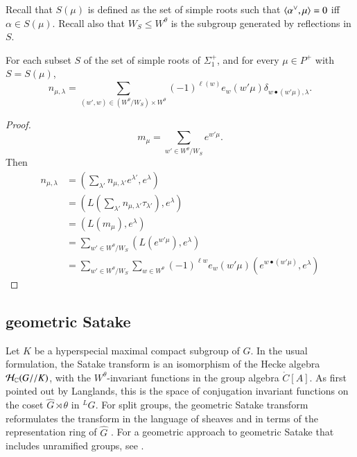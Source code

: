 Recall that $S(\mu)$ is defined as the set of simple roots
such that 
$\langle{\alpha^\vee,\mu}\rangle=0$ iff $\alpha\in S(\mu)$.
%
Recall also that $W_S\le W^\theta$ is the subgroup generated by reflections in $S$.

\begin{lemma}  For each subset $S$ of the set of simple roots of $\Sigma^+_1$,
and for every $\mu\in P^+$ with $S = S(\mu)$,
\[
n_{\mu,\lambda}=\sum_{(w',w)\in (W^\theta/W_S)\times W^\theta} (-1)^{\ell(w)} e_w(w'\mu) \delta_{w\bullet (w'\mu),\lambda}. 
\]
\end{lemma}

\begin{proof}  
\[
m_\mu = \sum_{w'\in W^\theta/W_S} e^{w' \mu}.
\]
Then
\begin{align*}
n_{\mu,\lambda} 
    &= (\sum_{\lambda'} n_{\mu,{\lambda'}} e^{\lambda'},e^\lambda) \\
     &= (L(\sum_{\lambda'} n_{\mu,\lambda'} \tau_{\lambda'}),e^\lambda) \\
     &= (L(m_\mu),e^\lambda) \\
     &= \sum_{w'\in W^\theta/W_S} (L(e^{w'\mu}),e^\lambda)\\
     &= \sum_{w'\in W^\theta/W_S} \sum_{w\in W^\theta} (-1)^{\ell w} e_w(w'\mu) (e^{w\bullet (w'\mu)},e^\lambda)
\end{align*}
\end{proof}

\subsection{geometric Satake}

Let $K$ be a hyperspecial maximal compact subgroup of $G$.  In the usual
formulation,  the Satake transform is an isomorphism of the 
Hecke algebra $\mathcal H_{\mathbb{C}}(G//K)$, with the $W^\theta$-invariant functions in the
group algebra $\ring{C}[A]$.  As first pointed out by Langlands, this is the
space of conjugation invariant functions on the coset $\hat G\rtimes \theta$ in
${}^LG$.  For split groups, the geometric Satake transform reformulates the
transform in the language of sheaves and
in terms of the representation ring of $\hat G$ \cite{mirkovic2007geometric}.
For a geometric approach to geometric Satake that includes unramified groups, 
see \cite{zhu2011geometric}.

